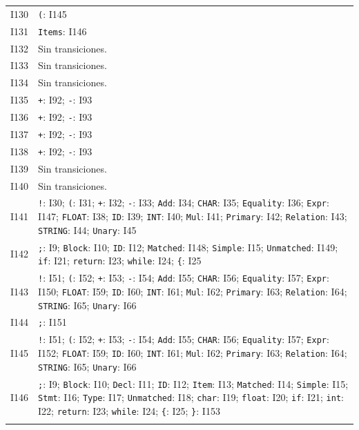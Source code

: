{\begin{longtable}{@{}r p{14.7cm}@{}}
I130 & \texttt{(}: I145\\\addlinespace[3pt]
I131 & \texttt{Items}: I146\\\addlinespace[3pt]
I132 & Sin transiciones.\\\addlinespace[3pt]
I133 & Sin transiciones.\\\addlinespace[3pt]
I134 & Sin transiciones.\\\addlinespace[3pt]
I135 & \texttt{+}: I92; \texttt{-}: I93\\\addlinespace[3pt]
I136 & \texttt{+}: I92; \texttt{-}: I93\\\addlinespace[3pt]
I137 & \texttt{+}: I92; \texttt{-}: I93\\\addlinespace[3pt]
I138 & \texttt{+}: I92; \texttt{-}: I93\\\addlinespace[3pt]
I139 & Sin transiciones.\\\addlinespace[3pt]
I140 & Sin transiciones.\\\addlinespace[3pt]
I141 & \texttt{!}: I30; \texttt{(}: I31; \texttt{+}: I32; \texttt{-}: I33; \texttt{Add}: I34; \texttt{CHAR}: I35; \texttt{Equality}: I36; \texttt{Expr}: I147; \texttt{FLOAT}: I38; \texttt{ID}: I39; \texttt{INT}: I40; \texttt{Mul}: I41; \texttt{Primary}: I42; \texttt{Relation}: I43; \texttt{STRING}: I44; \texttt{Unary}: I45\\\addlinespace[3pt]
I142 & \texttt{;}: I9; \texttt{Block}: I10; \texttt{ID}: I12; \texttt{Matched}: I148; \texttt{Simple}: I15; \texttt{Unmatched}: I149; \texttt{if}: I21; \texttt{return}: I23; \texttt{while}: I24; \texttt{\{}: I25\\\addlinespace[3pt]
I143 & \texttt{!}: I51; \texttt{(}: I52; \texttt{+}: I53; \texttt{-}: I54; \texttt{Add}: I55; \texttt{CHAR}: I56; \texttt{Equality}: I57; \texttt{Expr}: I150; \texttt{FLOAT}: I59; \texttt{ID}: I60; \texttt{INT}: I61; \texttt{Mul}: I62; \texttt{Primary}: I63; \texttt{Relation}: I64; \texttt{STRING}: I65; \texttt{Unary}: I66\\\addlinespace[3pt]
I144 & \texttt{;}: I151\\\addlinespace[3pt]
I145 & \texttt{!}: I51; \texttt{(}: I52; \texttt{+}: I53; \texttt{-}: I54; \texttt{Add}: I55; \texttt{CHAR}: I56; \texttt{Equality}: I57; \texttt{Expr}: I152; \texttt{FLOAT}: I59; \texttt{ID}: I60; \texttt{INT}: I61; \texttt{Mul}: I62; \texttt{Primary}: I63; \texttt{Relation}: I64; \texttt{STRING}: I65; \texttt{Unary}: I66\\\addlinespace[3pt]
I146 & \texttt{;}: I9; \texttt{Block}: I10; \texttt{Decl}: I11; \texttt{ID}: I12; \texttt{Item}: I13; \texttt{Matched}: I14; \texttt{Simple}: I15; \texttt{Stmt}: I16; \texttt{Type}: I17; \texttt{Unmatched}: I18; \texttt{char}: I19; \texttt{float}: I20; \texttt{if}: I21; \texttt{int}: I22; \texttt{return}: I23; \texttt{while}: I24; \texttt{\{}: I25; \texttt{\}}: I153\\\addlinespace[3pt]

\end{longtable}}
